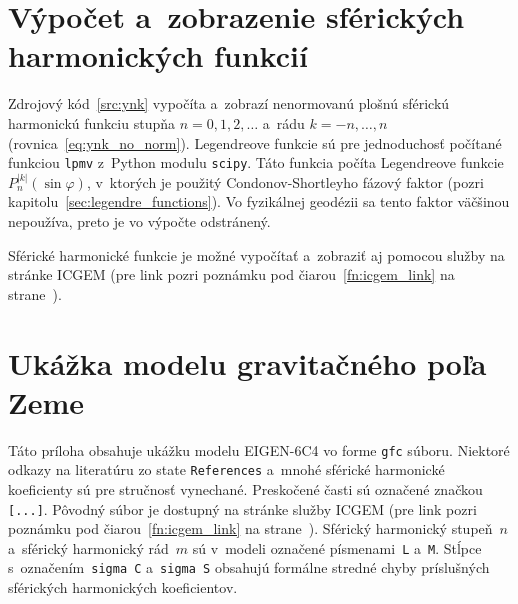 \documentclass[a4paper, 12pt]{book}
\begin{document}
\chapter{Výpočet a~zobrazenie sférických harmonických funkcií}
\label{app:sh}

Zdrojový kód~\ref{src:ynk} vypočíta a~zobrazí nenormovanú plošnú sférickú
harmonickú funkciu stupňa $n = 0, 1, 2, \dots$ a~rádu $k = -n, \dots, n$
(rovnica~\ref{eq:ynk_no_norm}).  Legendreove funkcie sú pre jednoduchosť
počítané funkciou \texttt{lpmv} z~Python modulu \texttt{scipy}.  Táto funkcia
počíta Legendreove funkcie $P_n^{|k|}(\sin\varphi)$, v~ktorých je
použitý Condonov-Shortleyho fázový faktor (pozri 
kapitolu~\ref{sec:legendre_functions}).  Vo fyzikálnej geodézii sa tento faktor 
väčšinou nepoužíva, preto je vo výpočte odstránený.

Sférické harmonické funkcie je možné vypočítať a~zobraziť aj pomocou služby na 
stránke ICGEM (pre link pozri poznámku pod čiarou~\ref{fn:icgem_link} na 
strane~\pageref{fn:icgem_link}).

\vspace{4ex}








\chapter{Ukážka modelu gravitačného poľa Zeme}
\label{app:gfc_file}

Táto príloha obsahuje ukážku modelu EIGEN-6C4 vo forme \texttt{gfc} súboru.  
Niektoré odkazy na literatúru zo state \texttt{References} a~mnohé sférické 
harmonické koeficienty sú pre stručnosť vynechané.  Preskočené časti sú 
označené značkou \texttt{[...]}.  Pôvodný súbor je dostupný na stránke služby 
ICGEM (pre link pozri poznámku pod čiarou~\ref{fn:icgem_link} na 
strane~\pageref{fn:icgem_link}).  Sférický harmonický stupeň~$n$ a~sférický 
harmonický rád~$m$ sú v~modeli označené písmenami~\texttt{L} a~\texttt{M}.  
Stĺpce s~označením~\texttt{sigma C} a~\texttt{sigma S} obsahujú formálne 
stredné chyby príslušných sférických harmonických koeficientov.

\vspace{10ex}
\footnotesize
\end{document}

